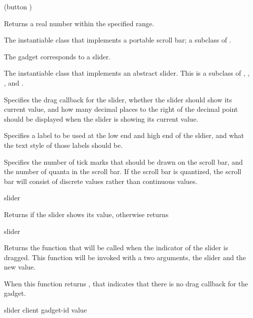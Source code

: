  {(button )}

Returns a real number within the specified range.


The instantiable class that implements a portable scroll bar; a subclass of
.



The  gadget corresponds to a slider.


The instantiable class that implements an abstract slider.  This is a subclass
of , , , and
.


Specifies the drag callback for the slider, whether the slider should show its
current value, and how many decimal places to the right of the decimal point
should be displayed when the slider is showing its current value.


Specifies a label to be used at the low end and high end of the sldier, and what
the text style of those labels should be.


Specifies the number of tick marks that should be drawn on the scroll bar, and
the number of quanta in the scroll bar.  If the scroll bar is quantized, the
scroll bar will consist of discrete values rather than continuous values.

 {slider}

Returns  if the slider shows its value, otherwise returns 

 {slider}

Returns the function that will be called when the indicator of the slider is
dragged.  This function will be invoked with a two arguments, the slider and the
new value.

When this function returns , that indicates that there is no drag
callback for the gadget.

 {slider client gadget-id value}

